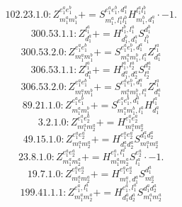 \documentclass[letterpaper,10pt,fleqn,leqno,onecolumn]{article}
\begin{document}
\begin{equation} \;\;\;\;\;\;  102.23.1.0: Z^{e_{1}^{a}e_{1}^{b}}_{m_{1}^{a}m_{1}^{b}}+=S^{e_{1}^{a}e_{1}^{b},d_{1}^{a}}_{m_{1}^{a},l_{1}^{a}l_{1}^{b}}H^{l_{1}^{a}l_{1}^{b}}_{m_{1}^{b},d_{1}^{a}}\cdot -1. \end{equation}
\begin{equation} \;\;\;\;\;\;  300.53.1.1: Z^{l_{1}^{a}}_{d_{1}^{a}}+=H^{l_{1}^{b},l_{1}^{a}}_{d_{1}^{b},d_{1}^{a}}S^{d_{1}^{b}}_{l_{1}^{b}} \end{equation}
\begin{equation} \;\;\;\;\;\;  300.53.2.0: Z^{e_{1}^{a}e_{1}^{b}}_{m_{1}^{a}m_{1}^{b}}+=S^{e_{1}^{a}e_{1}^{b},d_{1}^{a}}_{m_{1}^{a}m_{1}^{b},l_{1}^{a}}Z^{l_{1}^{a}}_{d_{1}^{a}} \end{equation}
\begin{equation} \;\;\;\;\;\;  306.53.1.1: Z^{l_{1}^{a}}_{d_{1}^{a}}+=H^{l_{1}^{a},l_{2}^{a}}_{d_{1}^{a},d_{2}^{a}}S^{d_{2}^{a}}_{l_{2}^{a}} \end{equation}
\begin{equation} \;\;\;\;\;\;  306.53.2.0: Z^{e_{1}^{a}e_{1}^{b}}_{m_{1}^{a}m_{1}^{b}}+=S^{e_{1}^{a}e_{1}^{b},d_{1}^{a}}_{m_{1}^{a}m_{1}^{b},l_{1}^{a}}Z^{l_{1}^{a}}_{d_{1}^{a}} \end{equation}
\begin{equation} \;\;\;\;\;\;  89.21.1.0: Z^{e_{1}^{a}e_{1}^{b}}_{m_{1}^{a}m_{1}^{b}}+=S^{e_{1}^{a}e_{1}^{b},d_{1}^{a}}_{m_{1}^{a}m_{1}^{b},l_{1}^{a}}H^{l_{1}^{a}}_{d_{1}^{a}} \end{equation}
\begin{equation} \;\;\;\;\;\;  3.2.1.0: Z^{e_{1}^{a}e_{2}^{a}}_{m_{1}^{a}m_{2}^{a}}+=H^{e_{1}^{a}e_{2}^{a}}_{m_{1}^{a}m_{2}^{a}} \end{equation}
\begin{equation} \;\;\;\;\;\;  49.15.1.0: Z^{e_{1}^{a}e_{2}^{a}}_{m_{1}^{a}m_{2}^{a}}+=H^{e_{1}^{a}e_{2}^{a}}_{d_{1}^{a}d_{2}^{a}}S^{d_{1}^{a}d_{2}^{a}}_{m_{1}^{a}m_{2}^{a}} \end{equation}
\begin{equation} \;\;\;\;\;\;  23.8.1.0: Z^{e_{1}^{a}e_{2}^{a}}_{m_{1}^{a}m_{2}^{a}}+=H^{e_{1}^{a},l_{1}^{a}}_{m_{1}^{a}m_{2}^{a}}S^{e_{2}^{a}}_{l_{1}^{a}}\cdot -1. \end{equation}
\begin{equation} \;\;\;\;\;\;  19.7.1.0: Z^{e_{1}^{a}e_{2}^{a}}_{m_{1}^{a}m_{2}^{a}}+=H^{e_{1}^{a}e_{2}^{a}}_{m_{1}^{a},d_{1}^{a}}S^{d_{1}^{a}}_{m_{2}^{a}} \end{equation}
\begin{equation} \;\;\;\;\;\;  199.41.1.1: Z^{e_{1}^{a},l_{1}^{a}}_{m_{1}^{a}m_{2}^{a}}+=H^{e_{1}^{a},l_{1}^{a}}_{d_{1}^{a}d_{2}^{a}}S^{d_{1}^{a}d_{2}^{a}}_{m_{1}^{a}m_{2}^{a}} \end{equation}
\end{document}
